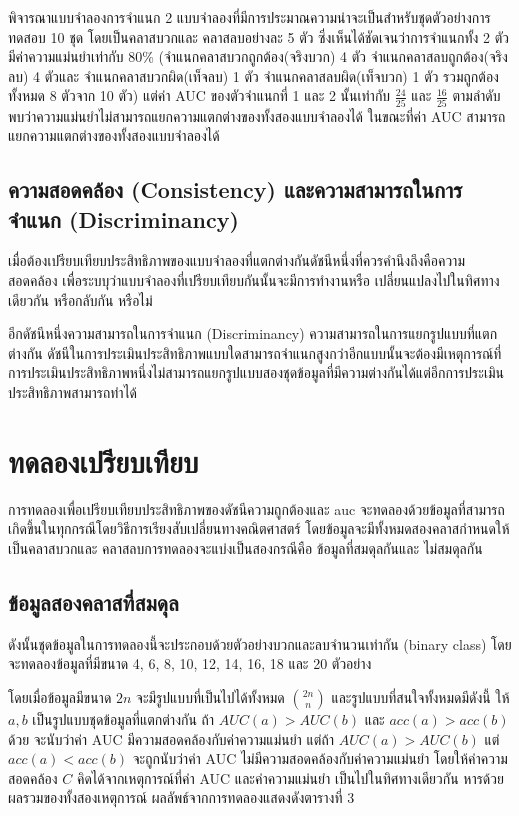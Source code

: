\documentclass[twoside, twocolumn, 12pt]{article}
\begin{document}
พิจารณาแบบจำลองการจำแนก 2 แบบจำลองที่มีการประมาณความน่าจะเป็นสำหรับชุดตัวอย่างการทดสอบ 10 ชุด โดยเป็นคลาสบวกและ คลาสลบอย่างละ 5 ตัว ซึ่งเห็นได้ชัดเจนว่าการจำแนกทั้ง 2 ตัว มีค่าความแม่นยำเท่ากับ 80\% (จำแนกคลาสบวกถูกต้อง(จริงบวก) 4 ตัว จำแนกคลาสลบถูกต้อง(จริงลบ) 4 ตัวและ จำแนกคลาสบวกผิด(เท็จลบ) 1 ตัว จำแนกคลาสลบผิด(เท็จบวก) 1 ตัว รวมถูกต้องทั้งหมด 8 ตัวจาก 10 ตัว) แต่ค่า AUC ของตัวจำแนกที่ 1 และ 2 นั้นเท่ากับ $\frac{24}{25}$ และ $\frac{16}{25}$ ตามลำดับ 
พบว่าความแม่นยำไม่สามารถแยกความแตกต่างของทั้งสองแบบจำลองได้ ในขณะที่ค่า AUC สามารถแยกความแตกต่างของทั้งสองแบบจำลองได้

\subsection{ความสอดคล้อง (Consistency) และความสามารถในการจำแนก (Discriminancy)}
\quad เมื่อต้องเปรียบเทียบประสิทธิภาพของแบบจำลองที่แตกต่างกันดัชนีหนึ่งที่ควรคำนึงถึงคือความสอดคล้อง เพื่อระบบุว่าแบบจำลองที่เปรียบเทียบกันนั้นจะมีการทำงานหรือ เปลี่ยนแปลงไปในทิศทางเดียวกัน หรือกลับกัน หรือไม่

อีกดัชนีหนึ่งความสามารถในการจำแนก (Discriminancy) ความสามารถในการแยกรูปแบบที่แตกต่างกัน ดัชนีในการประเมินประสิทธิภาพแบบใดสามารถจำแนกสูงกว่าอีกแบบนั้นจะต้องมีเหตุการณ์ที่การประเมินประสิทธิภาพหนึ่งไม่สามารถแยกรูปแบบสองชุดข้อมูลที่มีความต่างกันได้แต่อีกการประเมินประสิทธิภาพสามารถทำได้

\section{ทดลองเปรียบเทียบ}

\quad การทดลองเพื่อเปรียบเทียบประสิทธิภาพของดัชนีความถูกต้องและ auc จะทดลองด้วยข้อมูลที่สามารถเกิดขึ้นในทุกกรณีโดยวิธีการเรียงสับเปลี่ยนทางคณิตศาสตร์ โดยข้อมูลจะมีทั้งหมดสองคลาสกำหนดให้เป็นคลาสบวกและ คลาสลบการทดลองจะแบ่งเป็นสองกรณีคือ ข้อมูลที่สมดุลกันและ ไม่สมดุลกัน

\subsection{ข้อมูลสองคลาสที่สมดุล}
\quad ดังนั้นชุดข้อมูลในการทดลองนี้จะประกอบด้วยตัวอย่างบวกและลบจำนวนเท่ากัน (binary class) โดยจะทดลองข้อมูลที่มีขนาด 4, 6, 8, 10, 12, 14, 16, 18 และ 20 ตัวอย่าง

โดยเมื่อข้อมูลมีขนาด $2n$ จะมีรูปแบบที่เป็นไปได้ทั้งหมด ${{2n}\choose{n}}$ และรูปแบบที่สนใจทั้งหมดมีดังนี้ ให้ $a, b$ เป็นรูปแบบชุดข้อมูลที่แตกต่างกัน ถ้า $AUC(a) > AUC(b)$ และ $acc(a) > acc(b)$ ด้วย จะนับว่าค่า AUC มีความสอดคล้องกับค่าความแม่นยำ แต่ถ้า $AUC(a) > AUC(b)$ แต่ $acc(a) < acc(b)$ จะถูกนับว่าค่า AUC ไม่มีความสอดคล้องกับค่าความแม่นยำ โดยให้ค่าความสอดคล้อง $C$ คิดได้จากเหตุการณ์ที่ค่า AUC และค่าความแม่นยำ เป็นไปในทิศทางเดียวกัน หารด้วย ผลรวมของทั้งสองเหตุการณ์ ผลลัพธ์จากการทดลองแสดงดังตารางที่ 3
\end{document}
